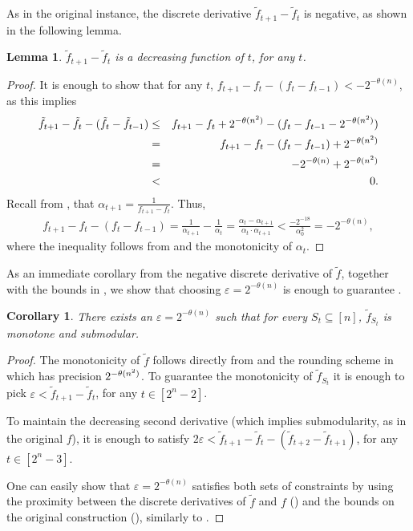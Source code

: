 \documentclass[11pt]{article}
\newtheorem{lemma}{Lemma}
\newtheorem{corollary}{Corollary}
\newcommand{\eps}{\varepsilon}
\newcommand{\tf}{\tilde{f}}
\begin{document}
As in the original instance, the discrete derivative  $\tf_{t+1}-\tf_{t}$ is negative, as shown in the following lemma.

\begin{lemma}\label{lem:ftlDecreasing}
$\tf_{t+1} - \tf_t$ is a decreasing function of $t$, for any $t$.
\end{lemma}

\begin{proof}
It is enough to show that for any $t$, 
$f_{t+1} - f_{t} - (f_t - f_{t-1}) < - 2^{-\theta(n)}$, as this implies
\begin{eqnarray*}
    \tf_{t+1} - \tf_{t} - (\tf_t - \tf_{t-1}) &\le& 
    f_{t+1} - f_{t} + 2^{-\tn} - (f_t - f_{t-1} - 2^{-\tn}) \\
    &=& 
    f_{t+1} - f_{t} - (f_t - f_{t-1}) + 2^{-\tn} \\ 
    &=& 
    - 2^{-\theta(n)} + 2^{-\tn} \\ 
    &<&
    0.
\end{eqnarray*}
Recall from , that $\alpha_{t+1} = \frac{1}{f_{t+1} - f_t}$. Thus,
\begin{eqnarray*}
    f_{t+1} - f_{t} - (f_t - f_{t-1}) =
    \frac{1}{\alpha_{t+1}} - \frac{1}{\alpha_{t}} 
    =
    \frac{\alpha_t - \alpha_{t+1}}{\alpha_t \cdot \alpha_{t+1}} 
    <
    \frac{-2^{-18}}{\alpha_0^2}
    =
    -2^{-\theta (n)},
\end{eqnarray*}
where the inequality follows from  and the monotonicity of $\alpha_t$.
\end{proof}

As an immediate corollary from the negative discrete derivative of $\tf$, together with the bounds in , we show that choosing $\eps = 2^{-\theta(n)}$ is enough to guarantee .
\begin{corollary}\label{cor:ftlSubmod}
     There exists an $\eps = 2^{-\theta(n)}$ such that for every $S_t \subseteq [n]$, $\tf_{S_t}$ is monotone and submodular.
\end{corollary}
\begin{proof}
    The monotonicity of $\tf$ follows directly from  and the rounding scheme in  which has precision $2^{-\theta(n^2)}$. To guarantee the monotonicity of $\tf_{S_t}$ it is enough to pick $\eps < \tf_{t+1}-\tf_t$, for any $t \in [2^n-2]$. 

    To maintain the decreasing second derivative (which implies submodularity, as in the original $f$), it is enough to satisfy $2\eps < \tf_{t+1}-\tf_t - (\tf_{t+2}-\tf_{t+1})$, for any $t \in [2^n-3]$.

    One can easily show that $\eps = 2^{-\theta(n)}$ satisfies both sets of constraints by using the proximity between the discrete derivatives of $\tf$ and $f$ () and the bounds on the original construction (), similarly to .
\end{proof}
\end{document}
